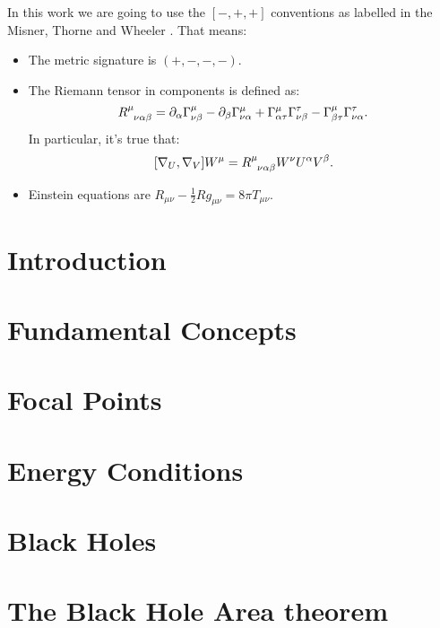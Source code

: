 \documentclass[12pt, a4paper]{book}
\begin{document}
In this work we are going to use the \([-, + , +]\) conventions as labelled in the Misner, Thorne and Wheeler \cite{misner1973gravitation}. That means:
\begin{itemize}
	\item[\ding{99}] The metric signature is \((+, -, -, -)\).
	\item[\ding{99}]  The Riemann tensor in components is defined as:
	\[
	R\indices{^{\mu}_{\nu\alpha\beta}} = \partial_{\alpha}\Gamma^{\mu}_{\nu\beta} - \partial_{\beta}\Gamma^{\mu}_{\nu\alpha} + \Gamma^{\mu}_{\alpha\tau}\Gamma^{\tau}_{\nu\beta} - \Gamma^{\mu}_{\beta\tau}\Gamma^{\tau}_{\nu\alpha}.
	\]
	In particular, it's true that:
	\[
	[\nabla_U, \nabla_V] W^{\mu} = R\indices{^{\mu}_{\nu\alpha\beta}}W^{\nu}U^{\alpha}V^{\beta}.
	\]
	\item[\ding{99}]  Einstein equations are \(R_{\mu\nu} - \frac{1}{2}Rg_{\mu\nu} = 8\pi T_{\mu\nu}\).
\end{itemize}

\chapter{Introduction}
\label{ch:introduction}


\chapter{Fundamental Concepts}


\chapter{Focal Points}
\label{ch:focal-points}


\chapter{Energy Conditions}
\label{ch:energy-conditions}


\chapter{Black Holes}
\label{ch:black-holes}


\chapter{The Black Hole Area theorem}
\label{ch:area-theorem}

\end{document}
